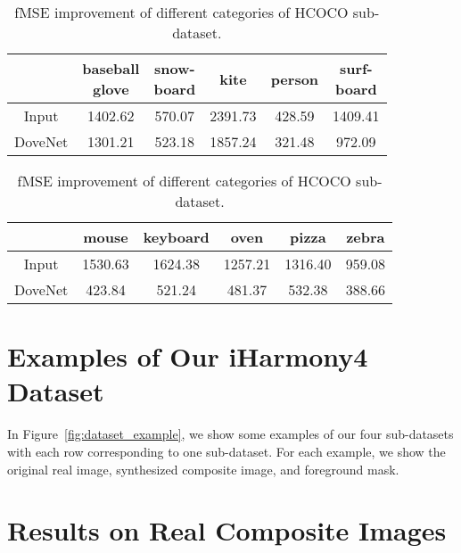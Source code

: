 \documentclass[10pt,twocolumn,letterpaper]{article}
\begin{document}
\setlength{\tabcolsep}{4pt}
\begin{table}	
	\centering
	\hspace{-18pt}
	\begin{subtable}[t]{3in}
		\centering
		\begin{tabular}{|c|c|c|c|c|c|}
			\hline
			  & \tabincell{c}{baseball\\ glove}  & \tabincell{c}{snow-\\board} & kite & person  & \tabincell{c}{surf-\\board}\\
			\hline
			Input  & 1402.62 & 570.07 & 2391.73 & 428.59 & 1409.41\\
			\hline
			DoveNet  & 1301.21 & 523.18 & 1857.24 & 321.48 & 972.09\\
			\hline
		\end{tabular}
		\caption{Categories with slightest fMSE improvement.}
		\label{tab:hard}
	\end{subtable}


	\begin{subtable}[t]{3in}
\hspace{-15pt}
		\begin{tabular}{|c|c|c|c|c|c|}
			\hline
			 & mouse & keyboard & oven & pizza & zebra  \\
			\hline
			Input & 1530.63 & 1624.38 & 1257.21 & 1316.40 & 959.08  \\
			\hline
			DoveNet & 423.84 & 521.24 & 481.37 & 532.38 & 388.66  \\
			\hline
		\end{tabular}
		\caption{Categories with largest fMSE improvement.}
		\label{tab:easy}
	\end{subtable}
	\caption{fMSE improvement of different categories of HCOCO sub-dataset.}\label{table:category}
\end{table}

\section{Examples of Our iHarmony4 Dataset}\label{sec:dataset_samples}

In Figure~\ref{fig:dataset_example}, we show some examples of our four sub-datasets with each row corresponding to one sub-dataset. For each example, we show the original real image, synthesized composite image, and foreground mask. 

\section{Results on Real Composite Images} \label{sec:results_real_composite}
\end{document}
